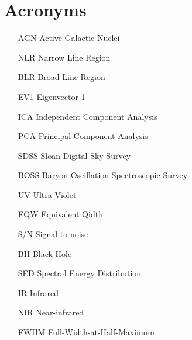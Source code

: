     \chapter*{Acronyms}
    \begin{itemize}
        \item[AGN]{Active Galactic Nuclei}
        \item[NLR]{Narrow Line Region}
        \item[BLR]{Broad Line Region}
        \item[EV1]{Eigenvector 1}
        \item[ICA]{Independent Component Analysis}
        \item[PCA]{Principal Component Analysis}
        \item[SDSS]{Sloan Digital Sky Survey}
        \item[BOSS]{Baryon Oscillation Spectroscopic Survey}
        \item[UV]{Ultra-Violet}
        \item[EQW]{Equivalent Qidth}
        \item[S/N]{Signal-to-noise}
        \item[BH]{Black Hole}
        \item[SED]{Spectral Energy Distribution}
        \item[IR]{Infrared}
        \item[NIR]{Near-infrared}
        \item[FWHM]{Full-Width-at-Half-Maximum}
    \end{itemize}     

          
\endgroup
